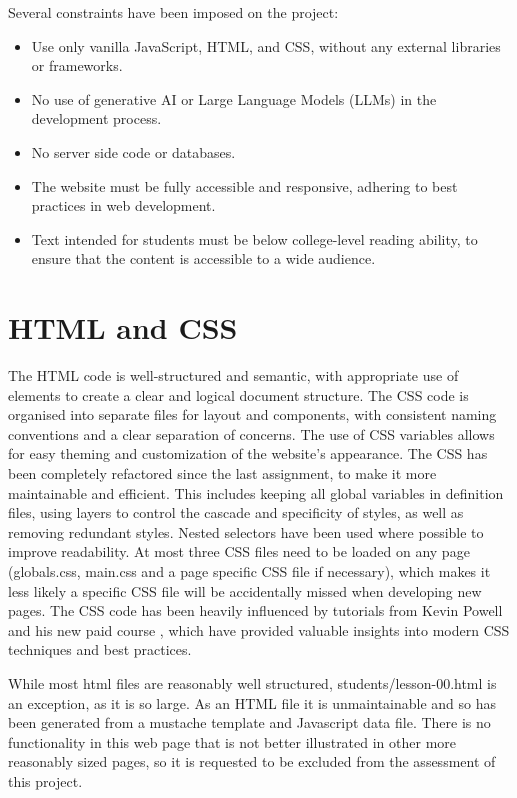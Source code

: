 \documentclass[a4paper, 12pt]{article}
\begin{document}
Several constraints have been imposed on the project:
\begin{itemize}
    \item Use only vanilla JavaScript, HTML, and CSS, without any external libraries or frameworks.
    \item No use of generative AI or Large Language Models (LLMs) in the development process.
    \item No server side code or databases.
    \item The website must be fully accessible and responsive, adhering to best practices in web development.
    \item Text intended for students must be below college-level reading ability, to ensure that the content is accessible to a wide audience.
\end{itemize}

\section{HTML and CSS}
The HTML code is well-structured and semantic, with appropriate use of elements to create a clear and logical document structure. The CSS code is organised into separate files for layout and components, with consistent naming conventions and a clear separation of concerns. The use of CSS variables allows for easy theming and customization of the website's appearance. The CSS has been completely refactored since the last assignment, to make it more maintainable and efficient. This includes keeping all global variables in definition files, using layers to control the cascade and specificity of styles, as well as removing redundant styles. Nested selectors have been used where possible to improve readability. At most three CSS files need to be loaded on any page (globals.css, main.css and a page specific CSS file if necessary), which makes it less likely a specific CSS file will be accidentally missed when developing new pages. The CSS code has been heavily influenced by tutorials from Kevin Powell \citep{powell_youtube} and his new paid course \citep{powell2026css}, which have provided valuable insights into modern CSS techniques and best practices.

While most html files are reasonably well structured, students/lesson-00.html is an exception, as it is so large. As an HTML file it is unmaintainable and so has been generated from a mustache \citep{mustache2009} template and Javascript data file. There is no functionality in this web page that is not better illustrated in other more reasonably sized pages, so it is requested to be excluded from the assessment of this project.
\end{document}
